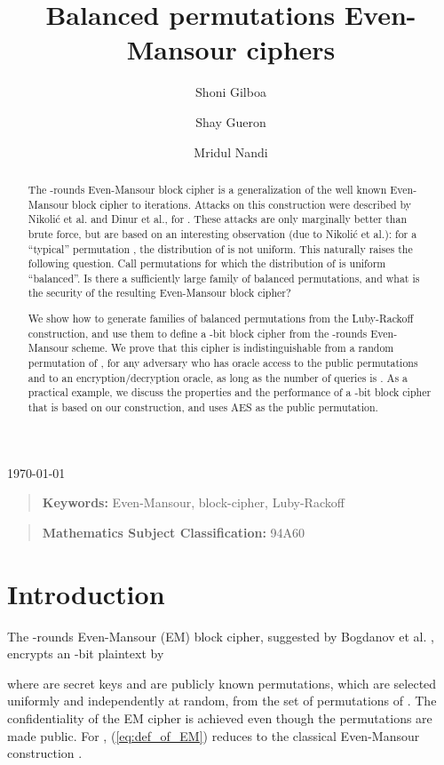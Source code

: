 \documentclass{llncs}
\title{Balanced permutations Even-Mansour ciphers}
\author{Shoni Gilboa \inst {1}  \and Shay Gueron \inst {2, 3} \and Mridul Nandi \inst {4}}
\institute{
The Open University of Israel, Raanana 43107, Israel
\and
University of Haifa, Israel
\and
Intel Corporation, Israel Development Center, Israel
\and
Indian Statistical Institute, Kolkata
}
\begin{document}
\maketitle
\centerline{\today}

\begin{abstract}
The -rounds Even-Mansour block cipher is a generalization of the well known Even-Mansour block cipher to  iterations. 
Attacks on this construction were described by Nikoli{\'c} et al. and Dinur et al., for .
These attacks are only marginally better than brute force, but are based on an interesting observation (due to Nikoli{\'c} et al.): for a ``typical'' permutation , the distribution of   is not uniform.
This naturally raises the following question. Call permutations for which the distribution of  is uniform ``balanced''. 
Is there a sufficiently large family of balanced permutations, and what is the security of the resulting Even-Mansour block cipher?

We show how to generate families of balanced permutations from the Luby-Rackoff construction, and use them to define a -bit block cipher from the -rounds Even-Mansour scheme.
We prove that this cipher is indistinguishable from a random permutation of , for any adversary who has oracle access to the public permutations and to an encryption/decryption oracle, as long as the number of queries is . As a practical example, we discuss the properties and the performance of a -bit block cipher that is based on our construction, and uses AES as the public permutation.
\end{abstract}

{\small
\begin{quote}
\textbf{Keywords:} Even-Mansour, block-cipher, Luby-Rackoff
\end{quote}}

{\small
\begin{quote}
\textbf{Mathematics Subject Classification:} 94A60
\end{quote}}

\section{Introduction}\label{intro}
The -rounds Even-Mansour (EM) block cipher, suggested by Bogdanov et al. \cite{BKLSST}, encrypts an -bit plaintext  by 

where  are secret keys and  are publicly known permutations, which are selected uniformly and independently at random, from the set of permutations of . 
The confidentiality of the EM cipher is achieved even though the permutations  are made public. 
For , (\ref{eq:def_of_EM}) reduces to the classical Even-Mansour construction \cite{EM}.  
\end{document}
